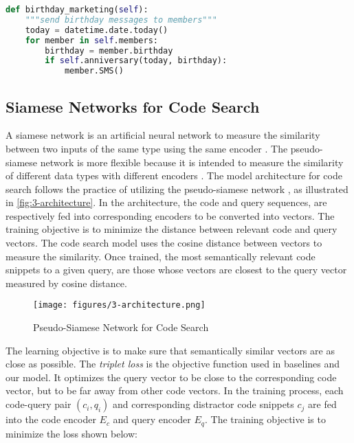 \documentclass[conference]{IEEEtran}
\begin{document}
\begin{lstlisting}[language=Python,label={lst:demo},caption=A Code Snippet in Python]
def birthday_marketing(self):
    """send birthday messages to members"""
    today = datetime.date.today()
    for member in self.members:
        birthday = member.birthday
        if self.anniversary(today, birthday):
            member.SMS()
\end{lstlisting} 
\subsection{Siamese Networks for Code Search}
\label{sec:intro-siamese}

A siamese network is an artificial neural network to measure the similarity between two inputs of the same type using the same encoder \cite{Zagoruyko2015LearningTC}. The pseudo-siamese network is more flexible because it is intended to measure the similarity of different data types with different encoders \cite{Hughes2018IdentifyingCP}. The model architecture for code search follows the practice of utilizing the pseudo-siamese network \cite{Gu2018DeepCS}, as illustrated in \autoref{fig:3-architecture}. In the architecture, the code and query sequences, are respectively fed into corresponding encoders to be converted into vectors. The training objective is to minimize the distance between relevant code and query vectors. The code search model uses the cosine distance between vectors to measure the similarity. Once trained, the most semantically relevant code snippets to a given query, are those whose vectors are closest to the query vector measured by cosine distance.

\begin{figure}[!htb]
  \centering
  \texttt{[image: figures/3-architecture.png]}
  \caption{Pseudo-Siamese Network for Code Search \cite{Husain2019CodeSearchNetCE}}
  \label{fig:3-architecture}
\end{figure}

The learning objective is to make sure that semantically similar vectors are as close as possible. The \emph{triplet loss} is the objective function used in baselines and our model. It optimizes the query vector to be close to the corresponding code vector, but to be far away from other code vectors.
In the training process, each code-query pair $(c_i, q_i)$ and corresponding distractor code snippets $c_j$ are fed into the code encoder $E_c$ and query encoder $E_q$. The training objective is to minimize the loss shown below:
\end{document}
